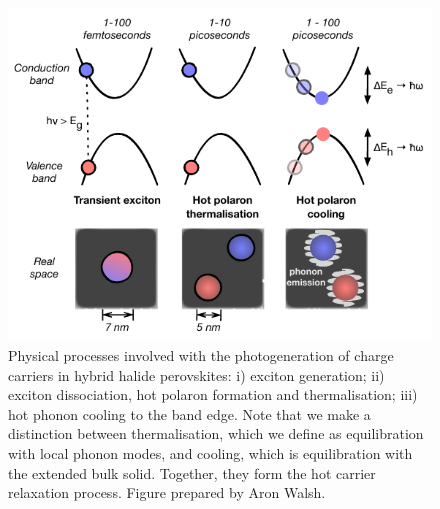 \begin{figure}[h!]
\centering
  \includegraphics[width=0.7\columnwidth]{figures/ch5/f1.pdf}
  \caption[Schematic of the hot carrier cooling model]{Physical processes involved with the photogeneration of charge carriers in hybrid halide perovskites: i) exciton generation; ii) exciton dissociation, hot polaron formation and thermalisation; iii) hot phonon cooling to the band edge. Note that we make a distinction between thermalisation, which we define as equilibration with local phonon modes, and cooling, which is equilibration with the extended bulk solid. Together, they form the hot carrier relaxation process. Figure prepared by Aron Walsh.}
\label{cooling_schematic}
\end{figure}

